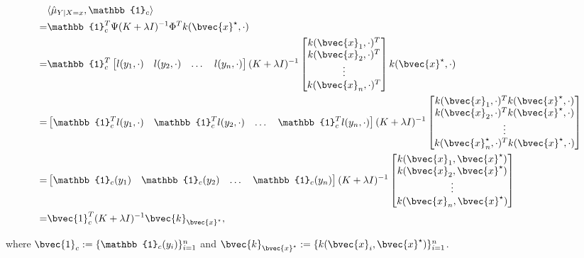 \documentclass[a4paper, 12pt]{article}
\begin{document}
	\begin{equation}
		\begin{aligned}
			& \langle \hat{\mu}_{Y | X = x}, \mathbb{1}_{c}  \rangle \\
			= & \mathbb{1}_{c}^{T} \Psi (K + \lambda I)^{-1} \Phi^{T} k(\bvec{x}^{\star}, \cdot) \\
			= & \mathbb{1}_{c}^{T} \begin{bmatrix} l(y_{1}, \cdot) & l(y_{2}, \cdot) & \dots & l(y_{n}, \cdot) \end{bmatrix} (K + \lambda I)^{-1} \begin{bmatrix} k(\bvec{x}_{1}, \cdot)^{T} \\ k(\bvec{x}_{2}, \cdot)^{T} \\ \vdots \\ k(\bvec{x}_{n}, \cdot)^{T} \end{bmatrix} k(\bvec{x}^{\star}, \cdot) \\
			= & \begin{bmatrix} \mathbb{1}_{c}^{T}l(y_{1}, \cdot) & \mathbb{1}_{c}^{T}l(y_{2}, \cdot) & \dots & \mathbb{1}_{c}^{T}l(y_{n}, \cdot) \end{bmatrix} (K + \lambda I)^{-1} \begin{bmatrix} k(\bvec{x}_{1}, \cdot)^{T} k(\bvec{x}^{\star}, \cdot) \\ k(\bvec{x}_{2}, \cdot)^{T} k(\bvec{x}^{\star}, \cdot)\\ \vdots \\ k(\bvec{x}^{\star}_{n}, \cdot)^{T} k(\bvec{x}^{\star}, \cdot) \end{bmatrix} \\
			= & \begin{bmatrix} \mathbb{1}_{c}(y_{1}) & \mathbb{1}_{c}(y_{2}) & \dots & \mathbb{1}_{c}(y_{n}) \end{bmatrix} (K + \lambda I)^{-1} \begin{bmatrix} k(\bvec{x}_{1}, \bvec{x}^{\star}) \\ k(\bvec{x}_{2}, \bvec{x}^{\star}) \\ \vdots \\ k(\bvec{x}_{n}, \bvec{x}^{\star}) \end{bmatrix} \\
			= & \bvec{1}_{c}^{T} (K + \lambda I)^{-1} \bvec{k}_{\bvec{x}^{\star}},
		\end{aligned}
	\end{equation}
	
	where $\bvec{1}_{c} := \{\mathbb{1}_{c}(y_{i})\}_{i = 1}^{n}$ and $\bvec{k}_{\bvec{x}^{\star}} := \{k(\bvec{x}_{i}, \bvec{x}^{\star})\}_{i = 1}^{n}$.
	
\end{document}

